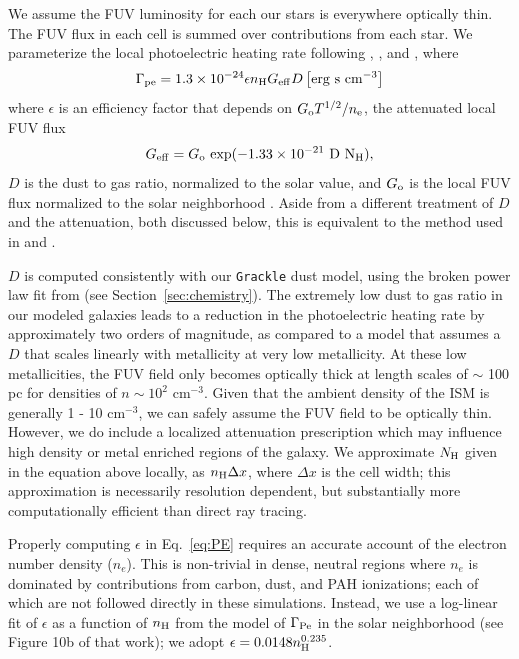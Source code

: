 \documentclass[twocolumn]{aastex61}
\newcommand{\ccunit}{cm$^{-3}$}
\begin{document}
We assume the FUV luminosity for each our stars is everywhere optically thin. The FUV flux in each cell is summed over contributions from each star. We parameterize the local photoelectric heating rate following \cite{BakesTielens1994}, \cite{Wolfire2003}, and \cite{Bergin2004}, where 
\begin{equation}
\label{eq:PE}
\Gamma_{\rm pe} = 1.3 \times 10^{-24} \epsilon n_{\rm H} G_{\rm eff} D \left[{\rm erg~s~cm^{-3}}\right]
\end{equation}
where $\epsilon$ is an efficiency factor that depends on $G_{\rm{o}} T^{1/2} /n_{\rm{e}}$, the attenuated local FUV flux \begin{equation} G_{\rm eff} = G_{\rm o}~\rm{exp}(-1.33\times10^{-21}~D~N_{\rm H}), \end{equation} $D$ is the dust to gas ratio, normalized to the solar value, and $G_{\rm o}$ is the local FUV flux normalized to the solar neighborhood \citep{Habing1968}. Aside from a different treatment of $D$ and the attenuation, both discussed below, this is equivalent to the method used in \cite{Hu2016} and \cite{Hu2017}.

$D$ is computed consistently with our \texttt{Grackle} dust model, using the broken power law fit from \cite{Remy-Ruyer2014} (see Section~\ref{sec:chemistry}). The extremely low dust to gas ratio in our modeled galaxies leads to a reduction in the photoelectric heating rate by approximately two orders of magnitude, as compared to a model that assumes a $D$ that scales linearly with metallicity at very low metallicity. At these low metallicities, the FUV field only becomes optically thick at length scales of $\sim$ 100 pc for densities of $n \sim 10^2$ \ccunit. Given that the ambient density of the ISM is generally 1 - 10 cm$^{-3}$, we can safely assume the FUV field to be optically thin. However, we do include a localized attenuation prescription which may influence high density or metal enriched regions of the galaxy. We approximate $N_{\rm H}$ given in the equation above locally, as $n_{\rm H}\Delta x$, where $\Delta x$ is the cell width; this approximation is necessarily resolution dependent, but substantially more computationally efficient than direct ray tracing.

Properly computing $\epsilon$ in Eq.~\ref{eq:PE} requires an accurate account of the electron number density ($n_e$). This is non-trivial in dense, neutral regions where $n_e$ is dominated by contributions from carbon, dust, and PAH ionizations; each of which are not followed directly in these simulations. Instead, we use a log-linear fit of $\epsilon$ as a function of $n_{\rm H}$ from the \cite{Wolfire2003} model of $\Gamma_{\rm{Pe}}$ in the solar neighborhood (see Figure 10b of that work); we adopt $\epsilon = 0.0148n_{\rm{H}}^{0.235}$. %
\end{document}

